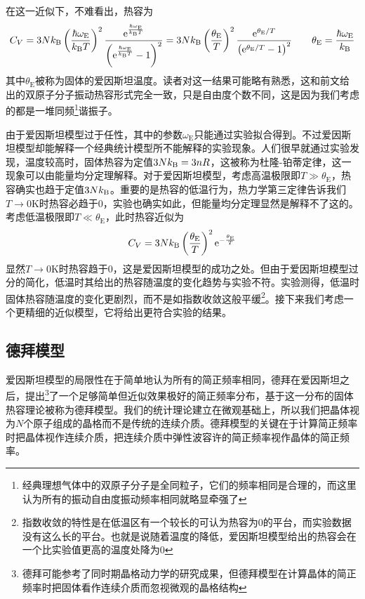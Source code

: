 \documentclass[../../main.tex]{subfiles}
\begin{document}
在这一近似下，不难看出，热容为
\begin{equation}
    C_V=3Nk_{\mathrm{B}} \left(\frac{\hbar\omega_{\mathrm{E}}}{k_{\mathrm{B}} T}\right)^2\frac{\mathrm{e}^{\frac{\hbar\omega_{\mathrm{E}}}{k_{\mathrm{B}} T}}}{\left(\mathrm{e}^{\frac{\hbar\omega_{\mathrm{E}}}{k_{\mathrm{B}} T}}-1\right)^2}=3Nk_{\mathrm{B}} \left(\frac{\theta_{\mathrm{E}}}{T}\right)^2\frac{\mathrm{e}^{\theta_{\mathrm{E}}/T}}{\left(\mathrm{e}^{\theta_{\mathrm{E}}/T}-1\right)^2}\qquad \theta_{\mathrm{E}}=\frac{\hbar\omega_{\mathrm{E}}}{k_{\mathrm{B}}}
\end{equation}
其中\(\theta_{\mathrm{E}}\)被称为固体的爱因斯坦温度。读者对这一结果可能略有熟悉，这和前文给出的双原子分子振动热容形式完全一致，只是自由度个数不同，这是因为我们考虑的都是一堆同频\footnote{经典理想气体中的双原子分子是全同粒子，它们的频率相同是合理的，而这里认为所有的振动自由度振动频率相同就略显牵强了}谐振子。

由于爱因斯坦模型过于任性，其中的参数\(\omega_{\text{E}}\)只能通过实验拟合得到。不过爱因斯坦模型却能解释一个经典统计模型所不能解释的实验现象。人们很早就通过实验发现，温度较高时，固体热容为定值\(3Nk_{\mathrm{B}}=3nR\)，这被称为杜隆-铂蒂定律，这一现象可以由能量均分定理解释。对于爱因斯坦模型，考虑高温极限即\(T\gg\theta_{\mathrm{E}}\)，热容确实也趋于定值\(3Nk_{\mathrm{B}}\)。重要的是热容的低温行为，热力学第三定律告诉我们\(T\to0\mathrm{K}\)时热容必趋于0，实验也确实如此，但能量均分定理显然是解释不了这的。考虑低温极限即\(T\ll\theta_{\mathrm{E}}\)，此时热容近似为
\begin{equation}
    C_V=3Nk_{\mathrm{B}}\left(\frac{\theta_{\mathrm{E}}}{T}\right)^2\mathrm{e}^{-\frac{\theta_{\mathrm{E}}}{T}}
\end{equation}
显然\(T\to0\mathrm{K}\)时热容趋于0，这是爱因斯坦模型的成功之处。但由于爱因斯坦模型过分的简化，低温时其给出的热容随温度的变化趋势与实验不符。实验测得，低温时固体热容随温度的变化更剧烈，而不是如指数收敛这般平缓\footnote{指数收敛的特性是在低温区有一个较长的可认为热容为0的平台，而实验数据没有这么长的平台。也就是说随着温度的降低，爱因斯坦模型给出的热容会在一个比实验值更高的温度处降为0}。接下来我们考虑一个更精细的近似模型，它将给出更符合实验的结果。
\subsection{德拜模型}

爱因斯坦模型的局限性在于简单地认为所有的简正频率相同，德拜在爱因斯坦之后，提出\footnote{德拜可能参考了同时期晶格动力学的研究成果，但德拜模型在计算晶体的简正频率时把固体看作连续介质而忽视微观的晶格结构}了一个足够简单但近似效果极好的简正频率分布，基于这一分布的固体热容理论被称为德拜模型。我们的统计理论建立在微观基础上，所以我们把晶体视为\(N\)个原子组成的晶格而不是传统的连续介质。德拜模型的关键在于计算简正频率时把晶体视作连续介质，把连续介质中弹性波容许的简正频率视作晶体的简正频率。
\end{document}
